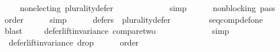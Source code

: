 \begin{isabellebody}
\ \ \isamarkupfalse%
\ {}{}{}{}{\isacharcolon}{\kern0pt}\ {\isachardoublequoteopen}non{\isacharunderscore}{\kern0pt}electing\ {\isacharquery}{\kern0pt}plurality{\isacharunderscore}{\kern0pt}defer{\isachardoublequoteclose}\isanewline
\ \ \ \ \isamarkupfalse%
\ {}{}{}{}{}\ {}{}{}{}{}\isanewline
\ \ \ \ \isamarkupfalse%
\ simp\ \isanewline
\ \ \isamarkupfalse%
\ {}{}{}{}{\isacharcolon}{\kern0pt}\ {\isachardoublequoteopen}non{\isacharunderscore}{\kern0pt}blocking\ {\isacharquery}{\kern0pt}pass{}{\isachardoublequoteclose}\isanewline
\ \ \ \ \isamarkupfalse%
\ order\isanewline
\ \ \ \ \isamarkupfalse%
\ simp\ \isanewline
\ \ \isamarkupfalse%
\ {}{}{}{}{\isacharcolon}{\kern0pt}\ {\isachardoublequoteopen}defers\ {}\ {\isacharquery}{\kern0pt}plurality{\isacharunderscore}{\kern0pt}defer{\isachardoublequoteclose}\isanewline
\ \ \ \ \isamarkupfalse%
\ {}{}{}{}{}\ {}{}{}{}{}\ {}{}{}{}{}\ seq{\isacharunderscore}{\kern0pt}comp{\isacharunderscore}{\kern0pt}def{\isacharunderscore}{\kern0pt}one\isanewline
\ \ \ \ \isamarkupfalse%
\ blast\isanewline
\isanewline
\ \ \isamarkupfalse%
\ {}{}{}{\isacharcolon}{\kern0pt}\ {\isachardoublequoteopen}defer{\isacharunderscore}{\kern0pt}lift{\isacharunderscore}{\kern0pt}invariance\ {\isacharquery}{\kern0pt}compare{\isacharunderscore}{\kern0pt}two{\isachardoublequoteclose}\isanewline
\ \ \ \ \isamarkupfalse%
\ {}{}{}{}\ {}{}{}{}\isanewline
\ \ \ \ \isamarkupfalse%
\ simp\ \isanewline
\ \ \isamarkupfalse%
\ {}{}{}{\isacharcolon}{\kern0pt}\ {\isachardoublequoteopen}defer{\isacharunderscore}{\kern0pt}lift{\isacharunderscore}{\kern0pt}invariance\ {\isacharquery}{\kern0pt}drop{}{\isachardoublequoteclose}\isanewline
\ \ \ \ \isamarkupfalse%
\ order\isanewline
\ \ \ \ \isamarkupfalse%

\end{isabellebody}
